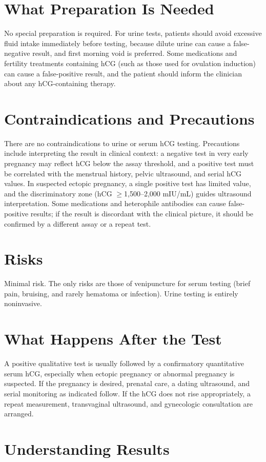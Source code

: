 \section*{What Preparation Is Needed}
No special preparation is required. For urine tests, patients should avoid excessive fluid intake immediately before testing, because dilute urine can cause a false-negative result, and first morning void is preferred. Some medications and fertility treatments containing hCG (such as those used for ovulation induction) can cause a false-positive result, and the patient should inform the clinician about any hCG-containing therapy.
\section*{Contraindications and Precautions}
There are no contraindications to urine or serum hCG testing. Precautions include interpreting the result in clinical context: a negative test in very early pregnancy may reflect hCG below the assay threshold, and a positive test must be correlated with the menstrual history, pelvic ultrasound, and serial hCG values. In suspected ectopic pregnancy, a single positive test has limited value, and the discriminatory zone (hCG $\geq$1,500--2,000 mIU/mL) guides ultrasound interpretation. Some medications and heterophile antibodies can cause false-positive results; if the result is discordant with the clinical picture, it should be confirmed by a different assay or a repeat test.
\section*{Risks}
Minimal risk. The only risks are those of venipuncture for serum testing (brief pain, bruising, and rarely hematoma or infection). Urine testing is entirely noninvasive.
\section*{What Happens After the Test}
A positive qualitative test is usually followed by a confirmatory quantitative serum hCG, especially when ectopic pregnancy or abnormal pregnancy is suspected. If the pregnancy is desired, prenatal care, a dating ultrasound, and serial monitoring as indicated follow. If the hCG does not rise appropriately, a repeat measurement, transvaginal ultrasound, and gynecologic consultation are arranged.
\section*{Understanding Results}
